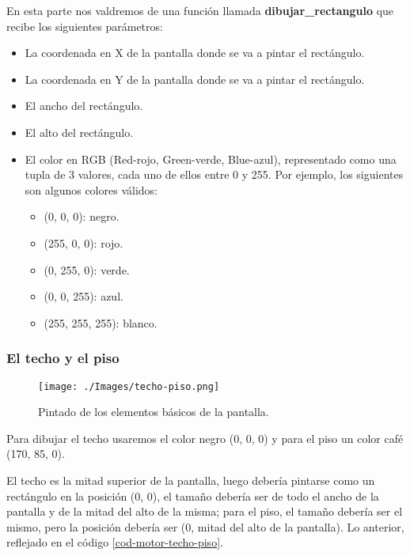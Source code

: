 En esta parte nos valdremos de una función llamada \textbf{dibujar\_rectangulo} que recibe los siguientes parámetros:

\begin{itemize}
\item La coordenada en X de la pantalla donde se va a pintar el rectángulo.
\item La coordenada en Y de la pantalla donde se va a pintar el rectángulo.
\item El ancho del rectángulo.
\item El alto del rectángulo.
\item El color en RGB (Red-rojo, Green-verde, Blue-azul), representado como una tupla de 3 valores, cada uno de ellos entre 0 y 255. Por ejemplo, los siguientes son algunos colores válidos:
	\begin{itemize}
	\item (0, 0, 0): negro.
	\item (255, 0, 0): rojo.
	\item (0, 255, 0): verde.
	\item (0, 0, 255): azul.
	\item (255, 255, 255): blanco.
	\end{itemize}
\end{itemize}

\subsubsection{El techo y el piso}

\begin{figure}[h!]
	\centering
	\texttt{[image: ./Images/techo-piso.png]}
	\caption{Pintado de los elementos básicos de la pantalla.}
	\label{techo-piso}
\end{figure}

Para dibujar el techo usaremos el color negro (0, 0, 0) y para el piso un color café (170, 85, 0). 

El techo es la mitad superior de la pantalla, luego debería pintarse como un rectángulo en la posición (0, 0), el tamaño debería ser de todo el ancho de la pantalla y de la mitad del alto de la misma; para el piso, el tamaño debería ser el mismo, pero la posición debería ser (0, mitad del alto de la pantalla). Lo anterior, reflejado en el código \ref{cod-motor-techo-piso}.

\newpage



